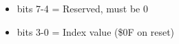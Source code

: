 \begin{itemize}
\item bits 7-4 = Reserved, must be 0
\item bits 3-0 = Index value (\$0F on reset)
\end{itemize}


